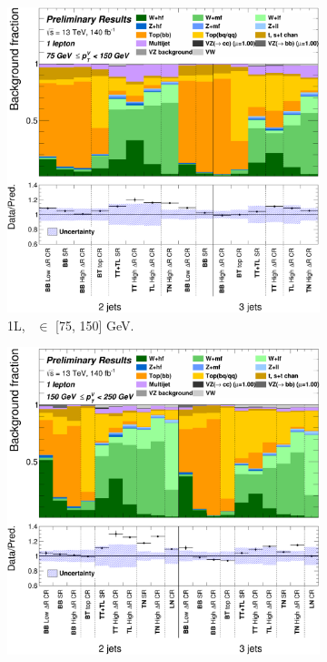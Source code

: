 \begin{figure}[h!]
{\begin{subfigure}[b]{0.37\textwidth}
            \includegraphics[width=\textwidth]{Images/VH/Own_fit/backCom_uncPrefit/GlobalFit_unconditional__Prefit/C_SRCRs_L1_BMax150_BMin75.png}
            \caption{1L, \ptv\ $\in$ [75, 150] GeV.}
            \label{fig:backCom_1L_1}
        \end{subfigure}
        \begin{subfigure}[b]{0.37\textwidth}
            \centering
            \includegraphics[width=\textwidth]{Images/VH/Own_fit/backCom_uncPrefit/GlobalFit_unconditional__Prefit/C_SRCRs_L1_BMax250_BMin150.png}

\end{subfigure}}
\end{figure}
